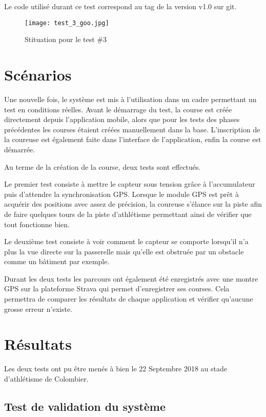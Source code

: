 Le code utilisé durant ce test correspond au tag de la version v1.0 sur git.

\begin{figure}[htb]
\centering 
\texttt{[image: test\_3\_goo.jpg]} 
\caption{Stituation pour le test \#3}
\label{fig:situation_test_3}
\end{figure}

\section{Scénarios}

Une nouvelle fois, le système est mis à l'utilisation dans un cadre permettant un test en conditions réelles. Avant le démarrage du test, la course est créée directement depuis l'application mobile, alors que pour les tests des phases précédentes les courses étaient créées manuellement dans la base. L'inscription de la coureuse est également faite dans l'interface de l'application, enfin la course est démarrée.

Au terme de la création de la course, deux tests sont effectués.

Le premier test consiste à mettre le capteur sous tension grâce à l'accumulateur puis d'attendre la synchronisation GPS. Lorsque le module GPS est prêt à acquérir des positions avec assez de précision, la coureuse s'élance sur la piste afin de faire quelques tours de la piste d'athlétisme permettant ainsi de vérifier que tout fonctionne bien.

Le deuxième test consiste à voir comment le capteur se comporte lorsqu'il n'a plus la vue directe sur la passerelle mais qu'elle est obstruée par un obstacle comme un bâtiment par exemple.

Durant les deux tests les parcours ont également été enregistrés  avec une montre GPS sur la plateforme Strava qui permet d'enregistrer ses courses. Cela permettra de comparer les résultats de chaque application et vérifier qu'aucune grosse erreur n'existe.

\section{Résultats}

Les deux tests ont pu être menés à bien le 22 Septembre 2018 au stade d'athlétisme de Colombier.

\subsection{Test de validation du système}

